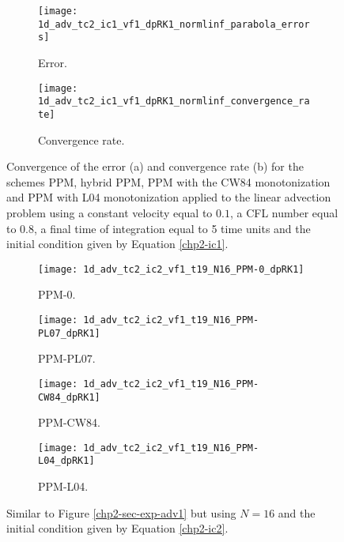 \begin{figure}[!htb]
  \centering
  \begin{subfigure}{0.45\textwidth}
    \centering
		\texttt{[image: 1d\_adv\_tc2\_ic1\_vf1\_dpRK1\_normlinf\_parabola\_errors]}
		\caption{Error.\label{chp2-sec-exp-adv1-error}}
  \end{subfigure}
  \begin{subfigure}{0.45\textwidth}
    \centering
			\texttt{[image: 1d\_adv\_tc2\_ic1\_vf1\_dpRK1\_normlinf\_convergence\_rate]}
		\caption{Convergence rate.\label{chp2-sec-exp-adv1-CR}}
  \end{subfigure}
	\caption{Convergence of the error (a) and convergence rate (b) for the schemes
  PPM, hybrid PPM, PPM with the CW84 monotonization and PPM with L04 monotonization
	applied to the linear advection problem using a constant velocity equal to $0.1$,
	a CFL number equal to $0.8$, a final time of integration equal to 5 time units
	and the initial condition given by Equation \eqref{chp2-ic1}.\label{chp2-sec-exp-adv1-2}}
\end{figure}

\newpage

\begin{figure}[!htb]
  \centering
  \begin{subfigure}{0.49\textwidth}
    \centering
			\texttt{[image: 1d\_adv\_tc2\_ic2\_vf1\_t19\_N16\_PPM-0\_dpRK1]}
			\caption{PPM-0.\label{chp2-sec-exp-adv2-a}}
  \end{subfigure}
  \begin{subfigure}{0.49\textwidth}
    \centering
			\texttt{[image: 1d\_adv\_tc2\_ic2\_vf1\_t19\_N16\_PPM-PL07\_dpRK1]}
			\caption{PPM-PL07.\label{chp2-sec-exp-adv2-b}}
  \end{subfigure}

  \begin{subfigure}{0.49\textwidth}
    \centering
		\texttt{[image: 1d\_adv\_tc2\_ic2\_vf1\_t19\_N16\_PPM-CW84\_dpRK1]}
    \caption{PPM-CW84.\label{chp2-sec-exp-adv2-c}}
  \end{subfigure}
  \begin{subfigure}{0.49\textwidth}
    \centering
			\texttt{[image: 1d\_adv\_tc2\_ic2\_vf1\_t19\_N16\_PPM-L04\_dpRK1]}
      \caption{PPM-L04.\label{chp2-sec-exp-adv2-d}}
  \end{subfigure} 
	\caption{ Similar to Figure \ref{chp2-sec-exp-adv1} but using $N=16$
	and the initial condition given by Equation \eqref{chp2-ic2}.\label{chp2-sec-exp-adv2}}
\end{figure}

